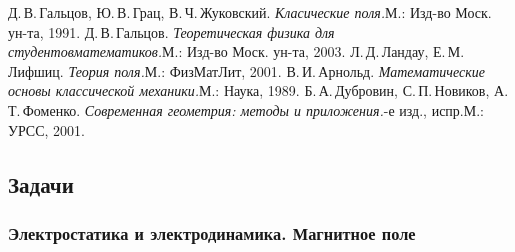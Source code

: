 \documentclass[a4paper,draft]{article}
\def\iof.#1#2.#3.{#1.\,#2.\,#3}
\begin{document}
\begin{thebibliography}{5}
\setlength\itemsep{-2pt}
    \iof.ДВ.Гальцов., \iof.ЮВ.Грац., \iof.ВЧ.Жуковский.. \emph{Класические поля.}\т М.: Изд-во Моск. ун-та, 1991.
    \iof.ДВ.Гальцов.. \emph{Теоретическая физика для студентов\д математиков.}\т М.: Изд-во Моск. ун-та, 2003.
    \iof.ЛД.Ландау., \iof.ЕМ.Лифшиц.. \emph{Теория поля.}\т М.: ФизМатЛит, 2001.
    \iof.ВИ.Арнольд.. \emph{Математические основы классической механики.}\т М.: Наука, 1989.
    \iof.БА.Дубровин., \iof.СП.Новиков., \iof.АТ.Фоменко.. \emph{Современная геометрия: методы и приложения.}-е изд., испр.\т М.: УРСС, 2001.
\end{thebibliography}

\subsection{Задачи}

\subsubsection{Электростатика и электродинамика. Магнитное поле}
\end{document}
